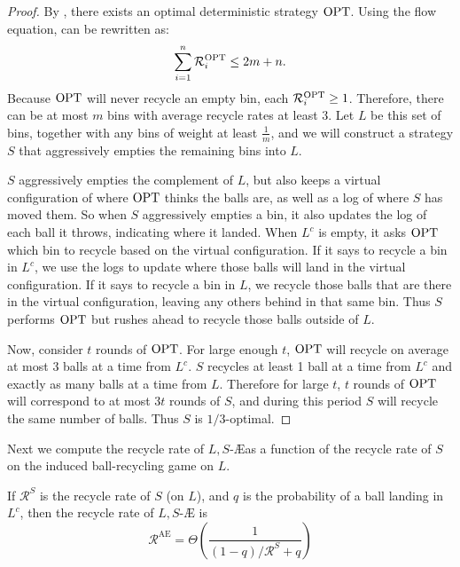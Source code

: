 \begin{proof}
	By , there exists an optimal deterministic
	strategy $\textrm{OPT}$. Using the flow equation,  can be
	rewritten as:
	\[ \sum_{i=1}^n \mathcal{R}_i^{\textrm{OPT}} \leq 2m + n. \]
	Because $\textrm{OPT}$ will never recycle an empty bin, each $\mathcal{R}_i^{\textrm{OPT}}
	\geq 1$.  Therefore, there can be at most $m$ bins with average recycle
	rates at least 3. Let $L$ be this set of bins, together with any bins of
	weight at least $\frac{1}{m}$, and we will construct a strategy $S$ that
	aggressively empties the remaining bins into $L$.
	
	$S$ aggressively empties the complement of $L$, but also keeps a virtual
	configuration of where $\textrm{OPT}$ thinks the balls are, as well as a log of
	where $S$ has moved them. So when $S$ aggressively empties a bin, it also
	updates the log of each ball it throws, indicating where it landed. When
	$L^c$ is empty, it asks $\textrm{OPT}$ which bin to recycle based on the virtual
	configuration. If it says to recycle a bin in $L^c$, we use the logs to
	update where those balls will land in the virtual configuration. If it says
	to recycle a bin in $L$, we recycle those balls that are there in the
	virtual configuration, leaving any others behind in that same bin.
	Thus $S$ performs $\textrm{OPT}$ but rushes ahead to recycle those balls outside of
	$L$.

	Now, consider $t$ rounds of $\textrm{OPT}$. For large enough $t$, $\textrm{OPT}$ will
	recycle on average at most 3 balls at a time from $L^c$. $S$ recycles at
	least 1 ball at a time from $L^c$ and exactly as many balls at a time from
	$L$.  Therefore for large $t$, $t$ rounds of $\textrm{OPT}$ will correspond to at
	most $3t$ rounds of $S$, and during this period $S$ will recycle the same
	number of balls. Thus $S$ is $1/3$-optimal.
\end{proof}

Next we compute the recycle rate of $L,S$-\AE as a function of the recycle rate
of $S$ on the induced ball-recycling game on $L$.

\begin{lemma}\label{lem:aggro-empty-bounds}
	If $\mathcal{R}^S$ is the recycle rate of $S$ (on $L$), and $q$ is the
	probability of a ball landing in $L^c$, then the recycle rate of $L,S$-\AE
	is
	\[\mathcal{R}^\textrm{AE} = \Theta\left(\frac{1}{(1 - q)/\mathcal{R}^S + q}\right)\]
\end{lemma}


